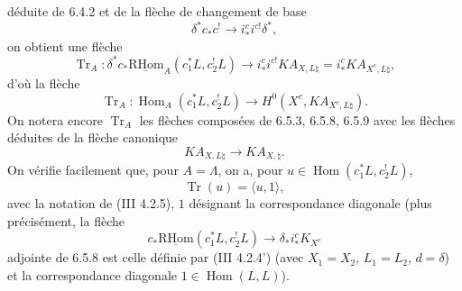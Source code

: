 \documentclass[11pt]{article}
\DeclareMathOperator{\Hom}{Hom}
\newcommand{\R}{\mathrm{R}}\newcommand{\RHomCore}{\mathrm{RHom}}
\providecommand{\RHom}{\RHomCore}
\providecommand{\uRHom}{\underline{\RHom}}
\providecommand{\Tr}{\operatorname{Tr}}
\providecommand{\Tr}{\operatorname{Tr}}
\providecommand{\Tr}{\operatorname{Tr}}
\providecommand{\RHom}{\RHomCore}
\providecommand{\Hom}{\operatorname{Hom}}
\providecommand{\RHom}{\R\mathcal{H}om}
\providecommand{\R}{\mathrm R}
\providecommand{\Tr}{\operatorname{Tr}}
\providecommand{\RHom}{\RHomCore}
\providecommand{\Hom}{\operatorname{Hom}}
\providecommand{\Tr}{\operatorname{Tr}}
\begin{document}
déduite de 6.4.2 et de la flèche de changement de base
\[
\delta^*c_*c^!\longrightarrow i_*^ci^{c!}\delta^*,
\]
on obtient une flèche
\begin{equation}
\Tr_A:\delta^*c_*\uRHom_A(c_1^*L,c_2^!L)
\longrightarrow
i_*^ci^{c!}KA_{X,L\natural}
=i_*^cKA_{X^c,L\natural},
\tag{6.5.8}
\end{equation}
d'où la flèche
\begin{equation}
\Tr_A:\Hom_A(c_1^*L,c_2^!L)
\longrightarrow
H^0(X^c,KA_{X^c,L\natural}).
\tag{6.5.9}
\end{equation}
On notera encore $\Tr_A$ les flèches composées de 6.5.3, 6.5.8, 6.5.9 avec les flèches déduites de la flèche canonique
\[
KA_{X,L\natural}\longrightarrow KA_{X,\natural}.
\]
On vérifie facilement que, pour $A=\Lambda$, on a, pour $u\in\Hom(c_1^*L,c_2^!L)$,
\begin{equation}
\Tr(u)=\langle u,1\rangle,
\tag{6.5.10}
\end{equation}
avec la notation de (III 4.2.5), $1$ désignant la correspondance diagonale (plus précisément, la flèche
\[
c_*\uRHom(c_1^*L,c_2^!L)\longrightarrow \delta_*i_*^cK_{X^c}
\]
adjointe de 6.5.8 est celle définie par (III 4.2.4') (avec $X_1=X_2$, $L_1=L_2$, $d=\delta$) et la correspondance diagonale $1\in\Hom(L,L)$).
\end{document}
